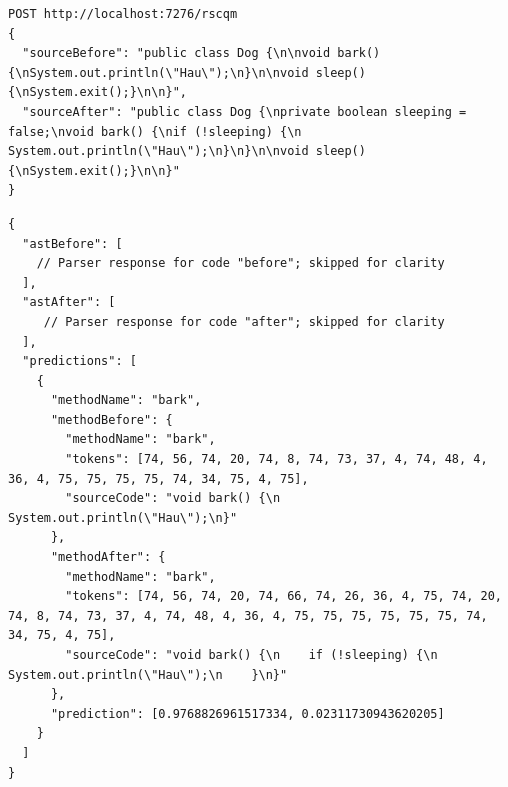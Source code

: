 \documentclass[twoside]{praca}
\begin{document}
\begin{lstlisting}[frame=single,caption={Przykład poprawnego żądania do~REST API modelu rSCQM},captionpos=b,label={lst:eval:rscqm:request}]
POST http://localhost:7276/rscqm
{
  "sourceBefore": "public class Dog {\n\nvoid bark() {\nSystem.out.println(\"Hau\");\n}\n\nvoid sleep() {\nSystem.exit();}\n\n}",
  "sourceAfter": "public class Dog {\nprivate boolean sleeping = false;\nvoid bark() {\nif (!sleeping) {\n  System.out.println(\"Hau\");\n}\n}\n\nvoid sleep() {\nSystem.exit();}\n\n}"
}
\end{lstlisting}



\pagebreak
\begin{lstlisting}[frame=single,caption={Przykład odpowiedzi z~predykcją dla modelu rSCQM},captionpos=b,label={lst:eval:rscqm:response}]
{
  "astBefore": [
    // Parser response for code "before"; skipped for clarity
  ], 
  "astAfter": [
     // Parser response for code "after"; skipped for clarity
  ], 
  "predictions": [
    {
      "methodName": "bark", 
      "methodBefore": {
        "methodName": "bark", 
        "tokens": [74, 56, 74, 20, 74, 8, 74, 73, 37, 4, 74, 48, 4, 36, 4, 75, 75, 75, 75, 74, 34, 75, 4, 75], 
        "sourceCode": "void bark() {\n    System.out.println(\"Hau\");\n}"
      }, 
      "methodAfter": {
        "methodName": "bark", 
        "tokens": [74, 56, 74, 20, 74, 66, 74, 26, 36, 4, 75, 74, 20, 74, 8, 74, 73, 37, 4, 74, 48, 4, 36, 4, 75, 75, 75, 75, 75, 75, 74, 34, 75, 4, 75],
        "sourceCode": "void bark() {\n    if (!sleeping) {\n        System.out.println(\"Hau\");\n    }\n}"
      }, 
      "prediction": [0.9768826961517334, 0.02311730943620205]
    }
  ]
}
\end{lstlisting}
\end{document}
